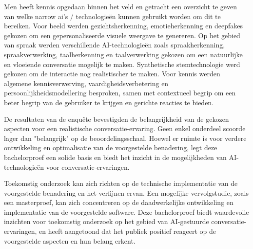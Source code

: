 Men heeft kennis opgedaan binnen het veld en getracht een overzicht te geven van welke narrow ai's / technologieën kunnen gebruikt worden om dit te bereiken. Voor beeld werden gezichtsherkenning, emotieherkenning en deepfakes gekozen om een gepersonaliseerde visuele weergave te genereren. Op het gebied van spraak werden verschillende AI-technologieën zoals spraakherkenning, spraakverwerking, taalherkenning en taalverwerking gekozen om een natuurlijke en vloeiende conversatie mogelijk te maken. Synthetische stemtechnologie werd gekozen om de interactie nog realistischer te maken. Voor kennis werden algemene kennisverwerving, vaardigheidsverbetering en persoonlijkheidsmodellering besproken, samen met contextueel begrip om een beter begrip van de gebruiker te krijgen en gerichte reacties te bieden.

De resultaten van de enquête bevestigden de belangrijkheid van de gekozen aspecten voor een realistische conversatie-ervaring. Geen enkel onderdeel scoorde lager dan "belangrijk" op de beoordelingsschaal. Hoewel er ruimte is voor verdere ontwikkeling en optimalisatie van de voorgestelde benadering, legt deze bachelorproef een solide basis en biedt het inzicht in de mogelijkheden van AI-technologieën voor conversatie-ervaringen.

Toekomstig onderzoek kan zich richten op de technische implementatie van de voorgestelde benadering en het verfijnen ervan. Een mogelijke vervolgstudie, zoals een masterproef, kan zich concentreren op de daadwerkelijke ontwikkeling en implementatie van de voorgestelde software. Deze bachelorproef biedt waardevolle inzichten voor toekomstig onderzoek op het gebied van AI-gestuurde conversatie-ervaringen, en heeft aangetoond dat het publiek positief reageert op de voorgestelde aspecten en hun belang erkent.